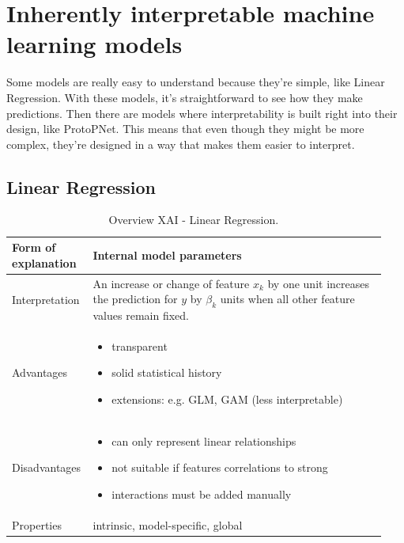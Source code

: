 
\newpage
\section{Inherently interpretable machine learning models}\label{sec:3}

Some models are really easy to understand because they're simple, like Linear Regression. With these models, it's straightforward to see how they make predictions.
Then there are models where interpretability is built right into their design, like ProtoPNet. This means that even though they might be more complex, they're designed in a way that makes them easier to interpret.

\subsection{Linear Regression}

\begin{table}[H]
  \centering
  \begin{tabular}{|p{0.17\linewidth}|p{0.77\linewidth}|}
    \hline
    Form of \newline explanation & 
    Internal model parameters \\
    
    \hline
    Interpretation & 
    An increase or change of feature  $x_k$  by one unit increases the prediction for $y$ by $\beta_k$  units when all other feature values remain fixed. \\
    \hline
    Advantages &
    \begin{itemize}[nosep, left=0em]
        \item transparent 
        \item solid statistical history
        \item extensions: e.g. GLM, GAM (less interpretable)
    \end{itemize} \\
    
    \hline
    Disadvantages &
    \begin{itemize}[nosep, left=0em]
        \item can only represent linear relationships 
        \item not suitable if features correlations to strong
        \item interactions must be added manually
    \end{itemize} \\
    
    \hline
    Properties & 
    intrinsic, model-specific, global  \\
    
    \hline
  \end{tabular}
  \caption{Overview XAI - Linear Regression.}
  \label{tab:XAILinReg}
\end{table}

